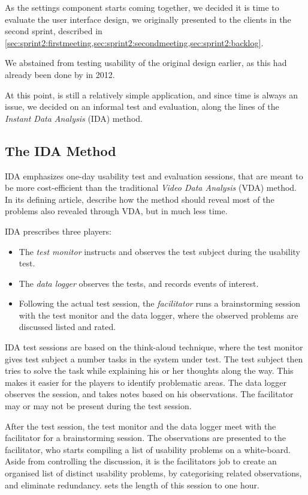 As the settings component starts coming together, we decided it is time to evaluate the user interface design, we originally presented to the clients in the second sprint, described in \cref{sec:sprint2:firstmeeting,sec:sprint2:secondmeeting,sec:sprint2:backlog}.

We abstained from testing usability of the original \launcher design earlier, as this had already been done by \cite{launcher2012} in 2012.

At this point, \launcher is still a relatively simple application, and since time is always an issue, we decided on an informal test and evaluation, along the lines of the \textit{Instant Data Analysis} (IDA) method. 

\subsection{The IDA Method}
IDA emphasizes one-day usability test and evaluation sessions, that are meant to be more cost-efficient than the traditional \textit{Video Data Analysis} (VDA) method. 
In its defining article, \cite{idaArticle} describe how the method should reveal most of the problems also revealed through VDA, but in much less time. 

IDA prescribes three players: 
\begin{itemize}
	\item The \textit{test monitor} instructs and observes the test subject during the usability test.
	\item The \textit{data logger} observes the tests, and records events of interest.
	\item Following the actual test session, the \textit{facilitator} runs a brainstorming session with the test monitor and the data logger, where the observed problems are discussed listed and rated. 
\end{itemize}

IDA test sessions are based on the think-aloud technique, where the test monitor gives test subject a number tasks in the system under test. The test subject then tries to solve the task while explaining his or her thoughts along the way. This makes it easier for the players to identify problematic areas. The data logger observes the session, and takes notes based on his observations. The facilitator may or may not be present during the test session.

After the test session, the test monitor and the data logger meet with the facilitator for a brainstorming session. The observations are presented to the facilitator, who starts compiling a list of usability problems on a white-board. Aside from controlling the discussion, it is the facilitators job to create an organised list of distinct usability problems, by categorising related observations, and eliminate redundancy. \citet{idaArticle} sets the length of this session to one hour. 

